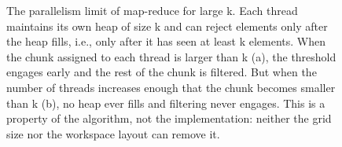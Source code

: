 \begin{figure}[H]
\begin{tikzpicture}[x=1.0cm, y=1.0cm]
    \end{tikzpicture}
    \caption[The parallelism limit of map-reduce]{The parallelism limit of map-reduce for large k. Each thread
    maintains its own heap of size k and can reject elements only
    after the heap fills, i.e., only after it has seen at least k elements. When
    the chunk assigned to each thread is larger than k (a), the threshold
    engages early and the rest of the chunk is filtered. But when
    the number of threads increases enough that the chunk becomes smaller than k
    (b), no heap ever fills and filtering never engages.
    This is a property of the algorithm, not the implementation: neither the grid
    size nor the workspace layout can remove it.}
    \label{fig:gpu-mapreduce-limit}
\end{figure}
